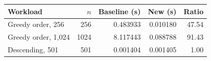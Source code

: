 \begin{center}
\small
\begin{tabular}{lrrrr}
\toprule
Workload & $n$ & Baseline (s) & New (s) & Ratio \\
\midrule
Greedy order, 256 & 256 & 0.483933 & 0.010180 & 47.54 \\
Greedy order, 1,024 & 1024 & 8.117443 & 0.088788 & 91.43 \\
Descending, 501 & 501 & 0.001404 & 0.001405 & 1.00 \\
\bottomrule
\end{tabular}
\end{center}
